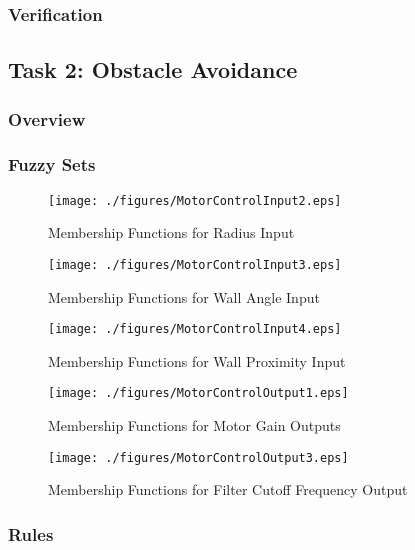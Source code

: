\documentclass[11pt]{article}
\begin{document}
\subsubsection{Verification}

\pagebreak
\subsection{Task 2: Obstacle Avoidance}

\subsubsection{Overview}
\subsubsection{Fuzzy Sets}
\begin{figure}[H]
    \centering
\texttt{[image: ./figures/MotorControlInput2.eps]}
\caption{Membership Functions for Radius Input}
\end{figure}

\begin{figure}[H]
    \centering
\texttt{[image: ./figures/MotorControlInput3.eps]}
\caption{Membership Functions for Wall Angle Input}
\end{figure}

\begin{figure}[H]
    \centering
\texttt{[image: ./figures/MotorControlInput4.eps]}
\caption{Membership Functions for Wall Proximity Input}
\end{figure}


\begin{figure}[H]
    \centering
\texttt{[image: ./figures/MotorControlOutput1.eps]}
\caption{Membership Functions for Motor Gain Outputs}
\end{figure}

\begin{figure}
    \centering
\texttt{[image: ./figures/MotorControlOutput3.eps]}
\caption{Membership Functions for Filter Cutoff Frequency Output}
\end{figure}

\subsubsection{Rules}
\end{document}
